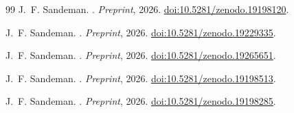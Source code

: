 \documentclass[11pt,a4paper]{article}
\begin{document}
\begin{thebibliography}{99}
J.~F. Sandeman.
.
\newblock \textit{Preprint}, 2026.
\newblock \href{https://doi.org/10.5281/zenodo.19198120}{doi:10.5281/zenodo.19198120}.

J.~F. Sandeman.
.
\newblock \textit{Preprint}, 2026.
\newblock \href{https://doi.org/10.5281/zenodo.19229335}{doi:10.5281/zenodo.19229335}.

J.~F. Sandeman.
.
\newblock \textit{Preprint}, 2026.
\newblock \href{https://doi.org/10.5281/zenodo.19265651}{doi:10.5281/zenodo.19265651}.

J.~F. Sandeman.
.
\newblock \textit{Preprint}, 2026.
\newblock \href{https://doi.org/10.5281/zenodo.19198513}{doi:10.5281/zenodo.19198513}.

J.~F. Sandeman.
.
\newblock \textit{Preprint}, 2026.
\newblock \href{https://doi.org/10.5281/zenodo.19198285}{doi:10.5281/zenodo.19198285}.

\end{thebibliography}
\end{document}

